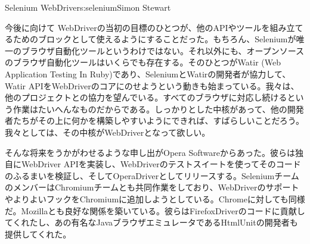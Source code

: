 \begin{aosachapter}{Selenium WebDriver}{s:selenium}{Simon Stewart}
\begin{aosasect1}{今後に向けて}
WebDriverの当初の目標のひとつが、他のAPIやツールを組み立てるためのブロックとして使えるようにすることだった。もちろん、Seleniumが唯一のブラウザ自動化ツールというわけではない。それ以外にも、オープンソースのブラウザ自動化ツールはいくらでも存在する。そのひとつがWatir (Web Application Testing In Ruby)であり、SeleniumとWatirの開発者が協力して、Watir APIをWebDriverのコアにのせようという動きも始まっている。我々は、他のプロジェクトとの協力を望んでいる。すべてのブラウザに対応し続けるという作業はたいへんなものだからである。しっかりとした中核があって、他の開発者たちがその上に何かを構築しやすいようにできれば、すばらしいことだろう。我々としては、その中核がWebDriverとなって欲しい。

そんな将来をうかがわせるような申し出がOpera Softwareからあった。彼らは独自にWebDriver APIを実装し、WebDriverのテストスイートを使ってそのコードのふるまいを検証し、そしてOperaDriverとしてリリースする。SeleniumチームのメンバーはChromiumチームとも共同作業をしており、WebDriverのサポートやよりよいフックをChromiumに追加しようとしている。Chromeに対しても同様だ。Mozillaとも良好な関係を築いている。彼らはFirefoxDriverのコードに貢献してくれたし、あの有名なJavaブラウザエミュレータであるHtmlUnitの開発者も提供してくれた。


\end{aosasect1}
\end{aosachapter}
